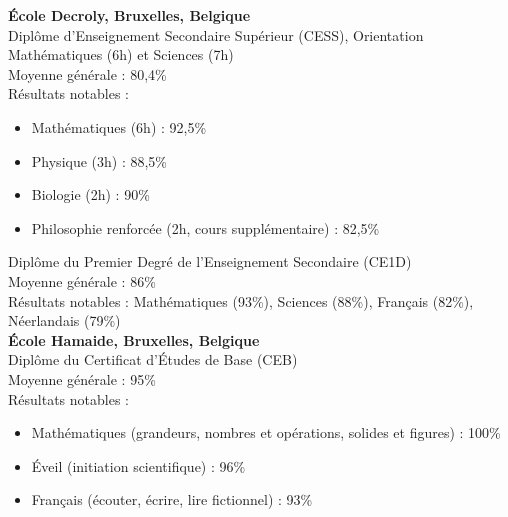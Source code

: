 \documentclass{article}
\begin{document}
\textbf{École Decroly, Bruxelles, Belgique}\\
Diplôme d'Enseignement Secondaire Supérieur (CESS), Orientation Mathématiques (6h) et Sciences (7h)\\
Moyenne générale : 80,4\%\\
Résultats notables :
\begin{itemize}
\item Mathématiques (6h) : 92,5\%
\item Physique (3h) : 88,5\%
\item Biologie (2h) : 90\%
\item Philosophie renforcée (2h, cours supplémentaire) : 82,5\%
\end{itemize}

Diplôme du Premier Degré de l'Enseignement Secondaire (CE1D)\\
Moyenne générale : 86\%\\
Résultats notables : Mathématiques (93\%), Sciences (88\%), Français (82\%), Néerlandais (79\%)\\

\textbf{École Hamaide, Bruxelles, Belgique}\\
Diplôme du Certificat d'Études de Base (CEB)\\
Moyenne générale : 95\%\\
Résultats notables :
\begin{itemize}
\item Mathématiques (grandeurs, nombres et opérations, solides et figures) : 100\%
\item Éveil (initiation scientifique) : 96\%
\item Français (écouter, écrire, lire fictionnel) : 93\%
\end{itemize}
\end{document}
